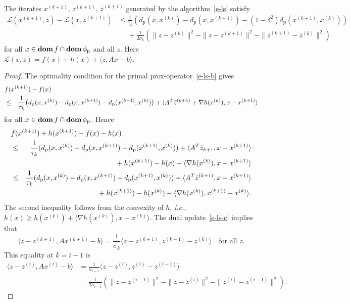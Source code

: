 \documentclass[letterpaper,11pt]{article}
\newcommand{\BEAS}{\begin{eqnarray*}}
\newcommand{\EEAS}{\end{eqnarray*}}
\newcommand{\BEA}{\begin{eqnarray}}
\newcommand{\EEA}{\end{eqnarray}}
\newcommand{\BEQ}{\begin{equation}}
\newcommand{\EEQ}{\end{equation}}
\newcommand{\ie}{{\it i.e.}}
\newcommand{\dom}{\mathop{\bf dom}}
\newcommand{\inprod}[2]{\langle#1, #2\rangle}
\newcommand{\primal}{\mathrm p}
\newcommand{\cL}{\mathcal L}
\begin{document}
The iterates $x^{(k+1)}$, $z^{(k+1)}$, $\bar z^{(k+1)}$
generated by the algorithm~\eqref{e-ls} satisfy
\begin{align}
\cL(x^{(k+1)},z)-\cL(x, \bar z^{(k+1)})
  &\leq \frac{1}{\tau_k} 
  \left(d_\primal(x,x^{(k)}) - d_\primal(x,x^{(k+1)}) -
  (1-\delta^2) d_\primal(x^{(k+1)},x^{(k)})\right) \nonumber \\
&\phantom{=} + \frac{1}{2\sigma_k} \left(
  \|z-z^{(k)}\|^2 - \|z-z^{(k+1)}\|^2 - 
  \|\bar z^{(k+1)} - z^{(k)}\|^2 \right) \label{e-ls-conv-i}
\end{align}
for all $x \in \dom f \cap \dom \phi_\primal$ and all $z$.
Here $\cL(x,z)=f(x)+h(x)+\inprod{z}{Ax-b}$.  
\begin{proof}
The optimality condition for the primal prox-operator~\eqref{e-ls-b}
gives
\BEAS
\lefteqn{f(x^{(k+1)})-f(x)} \\
&\leq & \frac{1}{\tau_k}
  \big(d_\primal(x,x^{(k)})-d_\primal(x,x^{(k+1)})-
  d_\primal(x^{(k+1)}, x^{(k)})\big)
  +\inprod{A^T\bar z^{(k+1)}+\nabla h(x^{(k)})}{x-x^{(k+1)}}
\EEAS
for all $x\in \dom f \cap \dom\phi_\primal$.
Hence
\BEA
\lefteqn{f(x^{(k+1)}) + h(x^{(k+1)}) - f(x) - h(x)} \nonumber \\
  &\leq & \frac{1}{\tau_k} (d_\primal(x,x^{(k)}) - 
  d_\primal(x,x^{(k+1)}) - d_\primal(x^{(k+1)}, x^{(k)}))
  + \inprod{A^T\bar z_{k+1}}{x - x^{(k+1)}} \nonumber \\
& &\mbox{} + h(x^{(k+1)})-h(x)+\inprod{\nabla h(x^{(k)})}{x-x^{(k+1)}}
  \nonumber \\
&\leq & \frac{1}{\tau_k} (d_\primal(x,x^{(k)}) - 
 d_\primal(x,x^{(k+1)}) - d_\primal(x^{(k+1)}, x^{(k)}))
  + \inprod{A^T\bar z^{(k+1)}}{x - x^{(k+1)}} \nonumber \\
& &\mbox{} +h(x^{(k+1)})-h(x^{(k)})
  -\inprod{\nabla h(x^{(k)})}{x^{(k+1)}-x^{(k)}}.
  \label{e-ls-conv-1}
\EEA
The second inequality follows from the convexity of $h$, \ie,
$h(x) \geq h(x^{(k)}) + \inprod{\nabla h(x^{(k)})}{x-x^{(k)}}$.
The dual update~\eqref{e-ls-c} implies that
\BEQ \label{e-ls-conv-2}
\inprod{z-z^{(k+1)}}{Ax^{(k+1)}-b}
= \frac{1}{\sigma_k} \inprod{z-z^{(k+1)}}{z^{(k+1)}-z^{(k)}}
\quad \mbox{for all $z$.}
\EEQ
This equality at $k=i-1$ is
\begin{align}
\inprod{z-z^{(i)}}{Ax^{(i)}-b}
  &= \frac{1}{\sigma_{i-1}} \inprod{z-z^{(i)}}{z^{(i)}-z^{(i-1)}} 
  \nonumber \\
&= \frac{1}{2\sigma_{i-1}} \left( \|z-z^{(i-1)}\|^2
  - \|z-z^{(i)}\|^2 - \|z^{(i)} - z^{(i-1)} \|^2 \right).
  \label{e-ls-conv-3}
\end{align}

\end{proof}
\end{document}
